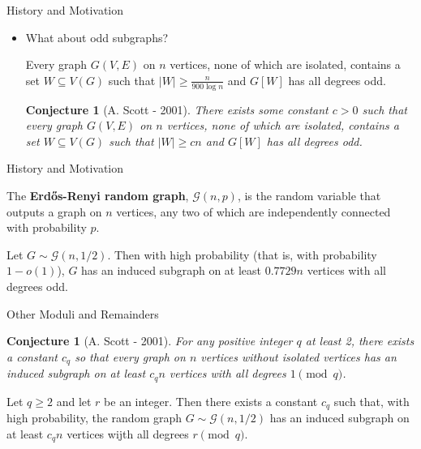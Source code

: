 \documentclass{beamer}
\theoremstyle{plain}
\newtheorem{conjecture}[theorem]{Conjecture}
\begin{document}
	\begin{frame}{History and Motivation}
		\begin{itemize}
			\item What about odd subgraphs?\pause

			\begin{theorem}[A. Scott - 1992]
				Every graph $G(V, E)$ on $n$ vertices, none of which are isolated, contains a set $W\subseteq V(G)$ such that $|W|\geq \frac{n}{900 \log n}$ and $G[W]$ has all degrees odd.
			\end{theorem}\pause

			\begin{conjecture}[A. Scott - 2001]
				There exists some constant $c>0$ such that every graph $G(V, E)$ on $n$ vertices, none of which are isolated, contains a set $W\subseteq V(G)$ such that $|W|\geq cn$ and $G[W]$ has all degrees odd.
			\end{conjecture}\pause
		\end{itemize}
	\end{frame}


	\begin{frame}{History and Motivation}
		\begin{definition}
			The \textbf{Erd\H{o}s-Renyi random graph}, $\mathcal{G}(n, p)$, is the random variable that outputs a graph on $n$ vertices, any two of which are independently connected with probability $p$.
		\end{definition}\pause

		\begin{theorem}[A. Scott - 1992]
			Let $G\sim \mathcal{G}(n, 1/2)$.
			Then with high probability (that is, with probability $1-o(1)$), $G$ has an induced subgraph on at least $0.7729n$ vertices with all degrees odd.
		\end{theorem}
	\end{frame}


	\begin{frame}{Other Moduli and Remainders}
		\begin{conjecture}[A. Scott - 2001]
			For any positive integer $q$ at least 2, there exists a constant $c_q$ so that every graph on $n$ vertices without isolated vertices has an induced subgraph on at least $c_qn$ vertices with all degrees $1\pmod q$.\pause
		\end{conjecture}
		\begin{theorem}
			Let $q\geq 2$ and let $r$ be an integer.
			Then there exists a constant $c_q$ such that, with high probability, the random graph $G\sim \mathcal{G}(n, 1/2)$ has an induced subgraph on at least $c_qn$ vertices wijth all degrees $r\pmod q$.
		\end{theorem}
	\end{frame}
\end{document}
